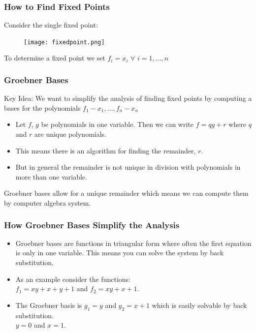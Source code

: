 \documentclass{beamer}
\begin{document}
\begin{frame}
	\frametitle{How to Find Fixed Points}
	Consider the single fixed point:
	\begin{figure}
		\centering
		\texttt{[image: fixedpoint.png]}
	\end{figure}
	To determine a fixed point we set $f_i=x_i$ $\forall$ $i=1,\ldots,n$
\end{frame}

\begin{frame}
	\frametitle{Groebner Bases}
	Key Idea: We want to simplify the analysis of finding fixed points by computing a bases for the polynomials $f_1-x_1,\ldots,f_n-x_n$\\
	\begin{itemize}
		\item{Let $f$, $g$ be polynomials in one variable. Then we can write $f=qg+r$ where $q$ and $r$ are unique polynomials.}\\
		\item{This means there is an algorithm for finding the remainder, $r$.}\\
		\item{But in general the remainder is not unique in division with polynomials in more than one variable.}\\
	\end{itemize}
	Groebner bases allow for a unique remainder which means we can compute them by computer algebra system.\\	 
\end{frame}

\begin{frame}
	\frametitle{How Groebner Bases Simplify the Analysis}
	\begin{itemize}
		\item{Groebner bases are functions in triangular form where often the first equation is only in one variable. This means you can solve the 			     system by back substitution.}\\ 
		\item{As an example consider the functions:\\ $f_1=xy+x+y+1$ and $f_2=xy+x+1$.}\\
		\item{The Groebner basis is $g_1=y$ and $g_2=x+1$ which is easily solvable by back substitution.}\\ $y=0$ and $x=1$.
	\end{itemize}
\end{frame}
\end{document}
